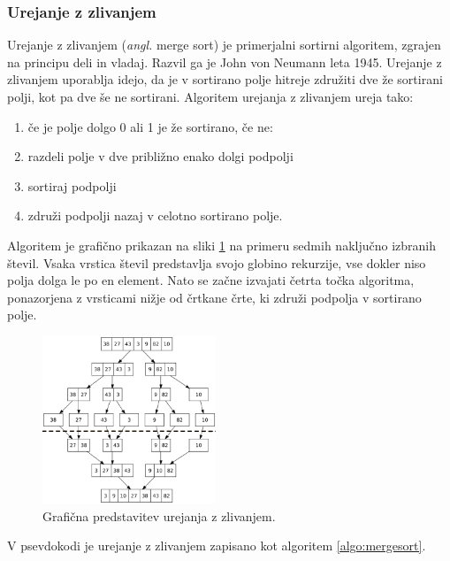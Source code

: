 \documentclass[a4paper,oneside,12pt]{article}
\begin{document}
\subsubsection{Urejanje z zlivanjem}
\label{chapter:mergesort}
Urejanje z zlivanjem (\emph{angl.} merge sort) je primerjalni sortirni algoritem, 
zgrajen na principu deli in vladaj. Razvil ga je John von Neumann leta 1945.
Urejanje z zlivanjem uporablja idejo, da je v sortirano polje hitreje združiti dve že
sortirani polji, kot pa dve še ne sortirani. 
Algoritem urejanja z zlivanjem ureja tako:
\begin{enumerate}
  \item če je polje dolgo 0 ali 1 je že sortirano, če ne:
  \item razdeli polje v dve približno enako dolgi podpolji
  \item sortiraj podpolji 
  \item združi podpolji nazaj v celotno sortirano polje.
\end{enumerate}

Algoritem je grafično prikazan na sliki \ref{fig:mergesortimage} na primeru sedmih
naključno izbranih števil.
Vsaka vrstica števil predstavlja svojo globino rekurzije, vse dokler niso polja dolga le
po en element. Nato se začne izvajati četrta točka algoritma, ponazorjena z vrsticami
nižje od črtkane črte, ki združi podpolja v sortirano polje.

\begin{figure}[h]
    \begin{center}
        \includegraphics[height=50mm]{slike/merge_sort.png}
    \end{center}
    \vspace{-0.7cm}
    \caption[Urejanje z zlivanjem]{Grafična predstavitev urejanja z zlivanjem.}
    \label{fig:mergesortimage}
\end{figure}

V psevdokodi je urejanje z zlivanjem zapisano kot algoritem \ref{algo:mergesort}. 
\end{document}
